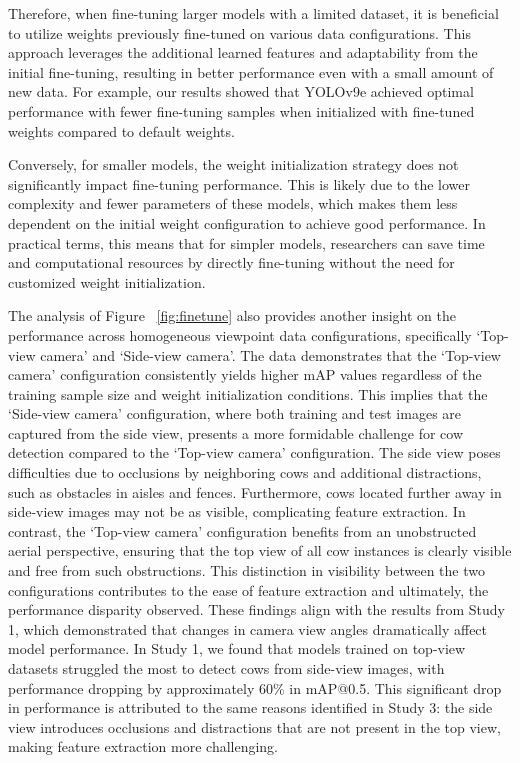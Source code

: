 Therefore, when fine-tuning larger models with a limited dataset, it is beneficial to utilize weights previously fine-tuned on various data configurations. This approach leverages the additional learned features and adaptability from the initial fine-tuning, resulting in better performance even with a small amount of new data. For example, our results showed that YOLOv9e achieved optimal performance with fewer fine-tuning samples when initialized with fine-tuned weights compared to default weights.

Conversely, for smaller models, the weight initialization strategy does not significantly impact fine-tuning performance. This is likely due to the lower complexity and fewer parameters of these models, which makes them less dependent on the initial weight configuration to achieve good performance. In practical terms, this means that for simpler models, researchers can save time and computational resources by directly fine-tuning without the need for customized weight initialization.

The analysis of Figure ~\ref{fig:finetune} also provides another insight on the performance across homogeneous viewpoint data configurations, specifically `Top-view camera' and `Side-view camera'. The data demonstrates that the `Top-view camera' configuration consistently yields higher mAP values regardless of the training sample size and weight initialization conditions. This implies that the `Side-view camera' configuration, where both training and test images are captured from the side view, presents a more formidable challenge for cow detection compared to the `Top-view camera' configuration. The side view poses difficulties due to occlusions by neighboring cows and additional distractions, such as obstacles in aisles and fences. Furthermore, cows located further away in side-view images may not be as visible, complicating feature extraction. In contrast, the `Top-view camera' configuration benefits from an unobstructed aerial perspective, ensuring that the top view of all cow instances is clearly visible and free from such obstructions. This distinction in visibility between the two configurations contributes to the ease of feature extraction and ultimately, the performance disparity observed. These findings align with the results from Study 1, which demonstrated that changes in camera view angles dramatically affect model performance. In Study 1, we found that models trained on top-view datasets struggled the most to detect cows from side-view images, with performance dropping by approximately 60\% in mAP@0.5. This significant drop in performance is attributed to the same reasons identified in Study 3: the side view introduces occlusions and distractions that are not present in the top view, making feature extraction more challenging.

